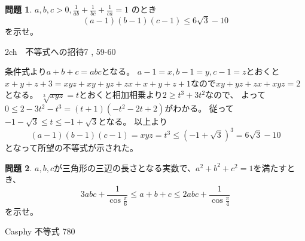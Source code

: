 \documentclass[uplatex, a5paper]{jsarticle}
\makeatletter
\theoremstyle{definition}
\newtheorem{prob}{問題}
\renewenvironment{proof}[1][\proofname]{
  \pushQED{\qed}%
  \normalfont \topsep6\p@\@plus6\p@\relax
  \trivlist
  \item[\hskip\labelsep
    #1\@addpunct{\textbf{.}}]\ignorespaces
}{%
  \popQED\endtrivlist\@endpefalse
}
\providecommand{\proofname}{証明}
\def\qed{\hfill $\Box$}
\makeatother
\begin{document}
\newpage

\begin{prob}
  \(a,b,c> 0 , \displaystyle\frac{1}{ab} + \frac{1}{bc} + \frac{1}{ca} = 1\)
  のとき
  \[
  (a-1)(b-1)(c-1) \leq 6\sqrt{3} -10
  \]
  を示せ。
  \begin{flushright}
    2ch　不等式への招待7 , 59-60
  \end{flushright}
\end{prob}


\begin{proof}
  条件式より\(a+b+c=abc\)となる。
  \(a-1=x, b-1=y, c-1=z\)とおくと\(x+y+z+3 = xyz+xy+yz+zx+x+y+z+1\)なので\(xy+yz+zx+xyz=2\)となる。
  \(\sqrt[3]{xyz}=t\)とおくと相加相乗より\(2\geq t^3+3t^2\)なので、
  よって\(0 \leq 2-3t^2-t^3 = (t+1)(-t^2-2t+2)\)がわかる。
  従って\(-1-\sqrt{3} \leq t \leq -1 + \sqrt{3}\)となる。
  以上より
  \[
  (a-1)(b-1)(c-1)=xyz=t^3 \leq (-1+\sqrt{3} )^3 = 6\sqrt{3} -10
  \]
  となって所望の不等式が示された。
\end{proof}










\newpage

\begin{prob}
  \(a,b,c\)が三角形の三辺の長さとなる実数で、\(a^2 + b^2 + c^2 = 1\)を満たすとき、
  \[
  3abc + \frac{1}{\cos \frac{\pi}{6}} \leq a+b+c \leq 2abc + \frac{1}{\cos \frac{\pi}{4}}
  \]
  を示せ。
  \begin{flushright}
    Casphy 不等式 780
  \end{flushright}
\end{prob}
\end{document}
